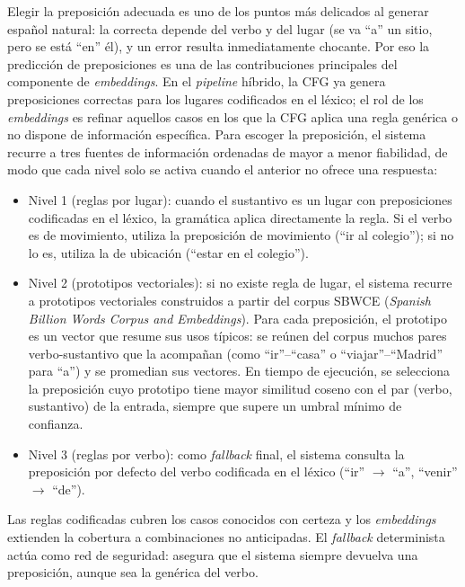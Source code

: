 Elegir la preposición adecuada es uno de los puntos más delicados al generar español natural: la correcta depende del verbo y del lugar (se va ``a'' un sitio, pero se está ``en'' él), y un error resulta inmediatamente chocante. Por eso la predicción de preposiciones es una de las contribuciones principales del componente de \textit{embeddings}. En el \textit{pipeline} híbrido, la CFG ya genera preposiciones correctas para los lugares codificados en el léxico; el rol de los \textit{embeddings} es refinar aquellos casos en los que la CFG aplica una regla genérica o no dispone de información específica. Para escoger la preposición, el sistema recurre a tres fuentes de información ordenadas de mayor a menor fiabilidad, de modo que cada nivel solo se activa cuando el anterior no ofrece una respuesta:

\begin{itemize}
    \item Nivel 1 (reglas por lugar): cuando el sustantivo es un lugar con preposiciones codificadas en el léxico, la gramática aplica directamente la regla. Si el verbo es de movimiento, utiliza la preposición de movimiento (``ir al colegio''); si no lo es, utiliza la de ubicación (``estar en el colegio'').
    \item Nivel 2 (prototipos vectoriales): si no existe regla de lugar, el sistema recurre a prototipos vectoriales construidos a partir del corpus SBWCE (\textit{Spanish Billion Words Corpus and Embeddings}). Para cada preposición, el prototipo es un vector que resume sus usos típicos: se reúnen del corpus muchos pares verbo-sustantivo que la acompañan (como ``ir''--``casa'' o ``viajar''--``Madrid'' para ``a'') y se promedian sus vectores. En tiempo de ejecución, se selecciona la preposición cuyo prototipo tiene mayor similitud coseno con el par (verbo, sustantivo) de la entrada, siempre que supere un umbral mínimo de confianza.
    \item Nivel 3 (reglas por verbo): como \textit{fallback} final, el sistema consulta la preposición por defecto del verbo codificada en el léxico (``ir'' $\rightarrow$ ``a'', ``venir'' $\rightarrow$ ``de'').
\end{itemize}

Las reglas codificadas cubren los casos conocidos con certeza y los \textit{embeddings} extienden la cobertura a combinaciones no anticipadas. El \textit{fallback} determinista actúa como red de seguridad: asegura que el sistema siempre devuelva una preposición, aunque sea la genérica del verbo.

